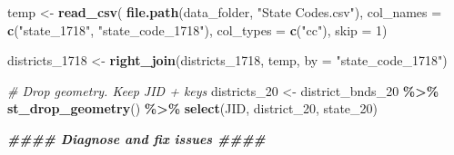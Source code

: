 \documentclass[
]{article}
\newenvironment{Shaded}{\begin{snugshade}}{\end{snugshade}}
\newcommand{\AttributeTok}[1]{\textcolor[rgb]{0.13,0.29,0.53}{#1}}
\newcommand{\CommentTok}[1]{\textcolor[rgb]{0.56,0.35,0.01}{\textit{#1}}}
\newcommand{\DecValTok}[1]{\textcolor[rgb]{0.00,0.00,0.81}{#1}}
\newcommand{\DocumentationTok}[1]{\textcolor[rgb]{0.56,0.35,0.01}{\textbf{\textit{#1}}}}
\newcommand{\FunctionTok}[1]{\textcolor[rgb]{0.13,0.29,0.53}{\textbf{#1}}}
\newcommand{\NormalTok}[1]{#1}
\newcommand{\OtherTok}[1]{\textcolor[rgb]{0.56,0.35,0.01}{#1}}
\newcommand{\SpecialCharTok}[1]{\textcolor[rgb]{0.81,0.36,0.00}{\textbf{#1}}}
\newcommand{\StringTok}[1]{\textcolor[rgb]{0.31,0.60,0.02}{#1}}
\begin{document}
\begin{Shaded}
\begin{Highlighting}[]
\NormalTok{temp }\OtherTok{\textless{}{-}} \FunctionTok{read\_csv}\NormalTok{(}
  \FunctionTok{file.path}\NormalTok{(data\_folder, }\StringTok{"State Codes.csv"}\NormalTok{),}
  \AttributeTok{col\_names =} \FunctionTok{c}\NormalTok{(}\StringTok{"state\_1718"}\NormalTok{, }\StringTok{"state\_code\_1718"}\NormalTok{),}
  \AttributeTok{col\_types =} \FunctionTok{c}\NormalTok{(}\StringTok{"cc"}\NormalTok{),}
  \AttributeTok{skip =} \DecValTok{1}\NormalTok{)}

\NormalTok{districts\_1718 }\OtherTok{\textless{}{-}} \FunctionTok{right\_join}\NormalTok{(districts\_1718, temp, }\AttributeTok{by =} \StringTok{"state\_code\_1718"}\NormalTok{)}


\CommentTok{\# Drop geometry. Keep JID + keys}
\NormalTok{districts\_20 }\OtherTok{\textless{}{-}}\NormalTok{ district\_bnds\_20 }\SpecialCharTok{\%\textgreater{}\%}
  \FunctionTok{st\_drop\_geometry}\NormalTok{() }\SpecialCharTok{\%\textgreater{}\%}
  \FunctionTok{select}\NormalTok{(JID, district\_20, state\_20)}


\DocumentationTok{\#\#\#\# Diagnose and fix issues \#\#\#\#}


\end{Highlighting}
\end{Shaded}
\end{document}

